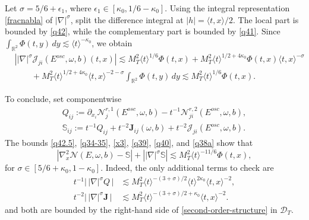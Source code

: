 \documentclass[reqno,11pt]{amsart}
\numberwithin{equation}{section}
\begin{document}
Let $\sigma=5/6+\epsilon_1$, where $\epsilon_1\in[\kappa_0,1/6-\kappa_0]$. Using the integral 
representation \eqref{fracnabla} of $|\nabla|^\sigma$, split the difference integral at
$|h|=\langle t,x\rangle/2$. The local part is bounded by \eqref{q42}, while
the complementary part is bounded by \eqref{q41}. Since
$\int_{\mathbb R^2}\Phi(t,y)\,dy\lesssim\langle t\rangle^{-\kappa_0}$, we obtain
\begin{equation}\label{q42.5}
\begin{split}
&\left||\nabla|^\sigma\mathcal J_{ji}(E^{osc},\omega,b)(t,x)\right|
\lesssim M_T^2\langle t\rangle^{1/6}\Phi(t,x)+M_T^2\langle t\rangle^{1/2+4\kappa_0}\Phi(t,x)\langle t,x\rangle^{-\sigma}\\
&\qquad+M_T^2\langle t\rangle^{1/2+4\kappa_0}\langle t,x\rangle^{-2-\sigma}\int_{\mathbb R^2}\Phi(t,y)\,dy\lesssim M_T^2\langle t\rangle^{1/6}\Phi(t,x).
\end{split}
\end{equation}

To conclude, set componentwise
\begin{align*}
Q_{ij}:=\partial_{x_i}\mathcal N_j^{r,1}(E^{osc},\omega,b)
-t^{-1}\mathcal N_{ji}^{r,2}(E^{osc},\omega,b),\\
\mathbb S_{ij}:=t^{-1}Q_{ij}
+t^{-2}\mathbf J_{ij}(\omega,b)
+t^{-2}\mathcal J_{ji}(E^{osc},\omega,b).
\end{align*}
The bounds \eqref{q42.5}, 
\eqref{q34-35}, \eqref{x3}, \eqref{q39}, \eqref{q40}, and \eqref{q38a} show that
\begin{equation}\label{second-order-structure}
\left|\nabla_x^2\mathcal N(E,\omega,b)-\mathbb S\right|
+\left||\nabla|^\sigma\mathbb S\right|
\lesssim M_T^2\langle t\rangle^{-11/6}\Phi(t,x),
\end{equation}
for $\sigma\in[5/6+\kappa_0,1-\kappa_0]$. Indeed, the only additional terms to check are
\begin{align*}
t^{-1}\bigl|\,|\nabla|^\sigma Q\,\bigr|
&\lesssim M_T^2\langle t\rangle^{-(3+\sigma)/2}
\langle t\rangle^{2\kappa_0}
\langle t,x\rangle^{-2},\\
t^{-2}\bigl|\,|\nabla|^\sigma\mathbf J\,\bigr|
&\lesssim M_T^2
\langle t\rangle^{-(3+\sigma)/2+\kappa_0}
\langle t,x\rangle^{-2}.
\end{align*}
and both are bounded by the right-hand side of
\eqref{second-order-structure} in $\mathcal D_T$.
\end{document}
